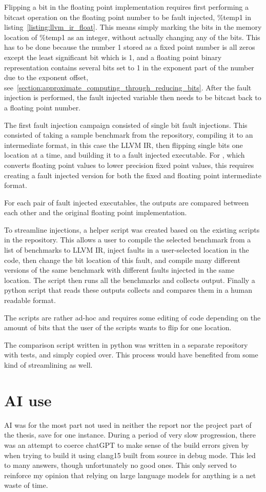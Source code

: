 Flipping a bit in the floating point implementation requires first performing a bitcast operation on the floating point number to be fault injected, \%temp1 in listing~\ref{listing:llvm_ir_float}. This means simply marking the bits in the memory location of \%temp1 as an integer, without actually changing any of the bits. This has to be done because the number 1 stored as a fixed point number is all zeros except the least significant bit which is 1, and a floating point binary representation contains several bits set to 1 in the exponent part of the number due to the exponent offset, see~\ref{section:approximate_computing_through_reducing_bits}. After the fault injection is performed, the fault injected variable then needs to be bitcast back to a floating point number.

The first fault injection campaign consisted of single bit fault injections. This consisted of taking a sample benchmark from the \taffo{} repository, compiling it to an intermediate format, in this case the LLVM IR, then flipping single bits one location at a time, and building it to a fault injected executable. For \taffo{}, which converts floating point values to lower precision fixed point values, this requires creating a fault injected version for both the fixed and floating point intermediate format.

For each pair of fault injected executables, the outputs are compared between each other and the original floating point implementation.

To streamline injections, a helper script was created based on the existing scripts in the \taffo{} repository. This allows a user to compile the selected benchmark from a list of benchmarks to LLVM IR, inject faults in a user-selected location in the code, then change the bit location of this fault, and compile many different versions of the same benchmark with different faults injected in the same location. The script then runs all the benchmarks and collects output. Finally a python script that reads these outputs collects and compares them in a human readable format.

The scripts are rather ad-hoc and requires some editing of code depending on the amount of bits that the user of the scripts wants to flip for one location.

The comparison script written in python was written in a separate repository with tests, and simply copied over. This process would have benefited from some kind of streamlining as well. 

\section{AI use}
AI was for the most part not used in neither the report nor the project part of the thesis, save for one instance. During a period of very slow progression, there was an attempt to coerce chatGPT to make sense of the build errors given by \taffo{} when trying to build it using clang15 built from source in debug mode. This led to many answers, though unfortunately no good ones. This only served to reinforce my opinion that relying on large language models for anything is a net waste of time. 
